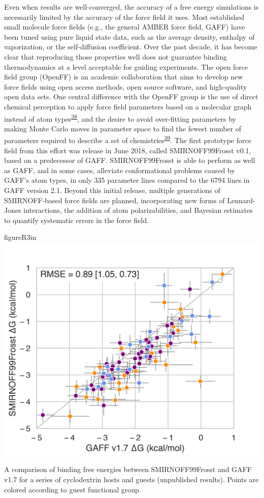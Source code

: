 \documentclass[11pt,notitlepage]{article}
\begin{document}
Even when results are well-converged, the accuracy of a free energy
simulations is necessarily limited by the accuracy of the force field it
uses. Most established small molecule force fields (e.g., the general
AMBER force field, GAFF) have been tuned using pure liquid state data,
such as the average density, enthalpy of vaporization, or the
self-diffusion coefficient. Over the past decade, it has become clear
that reproducing those properties well does not guarantee binding
thermodynamics at a level acceptable for guiding experiments. The open
force field group (OpenFF) is an academic collaboration that aims to
develop new force fields using open access methods, open source
software, and high-quality open data sets. One central difference with
the OpenFF group is the use of direct chemical perception to apply force
field parameters based on a molecular graph instead of atom
types\textsuperscript{\protect\hyperlink{ref-HlBr7NrU}{38}}, and the
desire to avoid over-fitting parameters by making Monte Carlo moves in
parameter space to find the fewest number of parameters required to
describe a set of
chemistries\textsuperscript{\protect\hyperlink{ref-13lTSBgHy}{39}}. The
first prototype force field from this effort was release in June 2018,
called SMIRNOFF99Frosst v0.1, based on a predecessor of GAFF.
SMIRNOFF99Frosst is able to perform as well as GAFF, and in some cases,
alleviate conformational problems caused by GAFF's atom types, in only
335 parameter lines compared to the 6794 lines in GAFF version 2.1.
Beyond this initial release, multiple generations of SMIRNOFF-based
force fields are planned, incorporating new forms of Lennard-Jones
interactions, the addition of atom polarizabilities, and Bayesian
estimates to quantify systematic errors in the force field.


\begin{wrapfloat}{figure}{R}{3in}
\centering
\includegraphics{content/images/SMIRNOFF-vs-GAFF-deltaG.png}
\caption{A comparison of binding free energies between SMIRNOFF99Frosst
and GAFF v1.7 for a series of cyclodextrin hosts and guests (unpublished
results). Points are colored according to guest functional group.}
\label{fig:smirnoff}
\end{wrapfloat}
\end{document}
